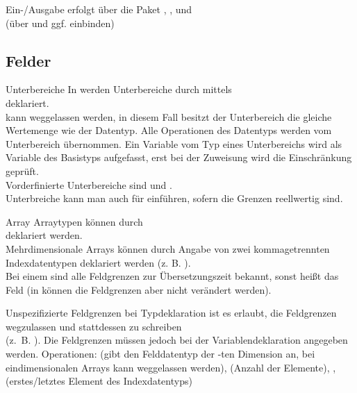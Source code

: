 \begin{Def}{Ein-/Ausgabe}
    erfolgt über die Paket ,
    , und \\
    (über  und ggf.  einbinden)
\end{Def}

\subsection{%
    Felder%
}

\begin{Def}{Unterbereiche}
    In \Ada{} werden Unterbereiche durch  mittels \\
    deklariert. \\
     kann weggelassen werden, in diesem Fall
    besitzt der Unterbereich die gleiche Wertemenge wie der Datentyp.
    Alle Operationen des Datentyps werden vom Unterbereich übernommen.
    Ein Variable vom Typ eines Unterbereichs wird als Variable des Basistyps
    aufgefasst, erst bei der Zuweisung wird die Einschränkung geprüft. \\
    Vorderfinierte Unterbereiche sind  und
    . \\
    Unterbreiche kann man auch für  einführen, sofern die
    Grenzen reellwertig sind.
\end{Def}

\begin{Def}{Array}
    Arraytypen können durch \\
    deklariert werden. \\
    Mehrdimensionale Arrays können durch Angabe von zwei kommagetrennten
    Indexdatentypen deklariert werden (z. B.
    ). \\
    Bei einem  sind alle Feldgrenzen zur
    Übersetzungszeit bekannt, sonst heißt das Feld 
    (in \Ada{} können die Feldgrenzen aber nicht verändert werden).
\end{Def}

\begin{Def}{Unspezifizierte Feldgrenzen}
    bei Typdeklaration ist es erlaubt, die Feldgrenzen wegzulassen und
    stattdessen  zu schreiben \\
    (z.~B. ).
    Die Feldgrenzen müssen jedoch bei der Variablendeklaration angegeben
    werden.
    Operationen:  (gibt den Felddatentyp der
    -ten Dimension an, bei eindimensionalen Arrays kann
     weggelassen werden),  (Anzahl der
    Elemente), ,  (erstes/letztes
    Element des Indexdatentyps)
\end{Def}

